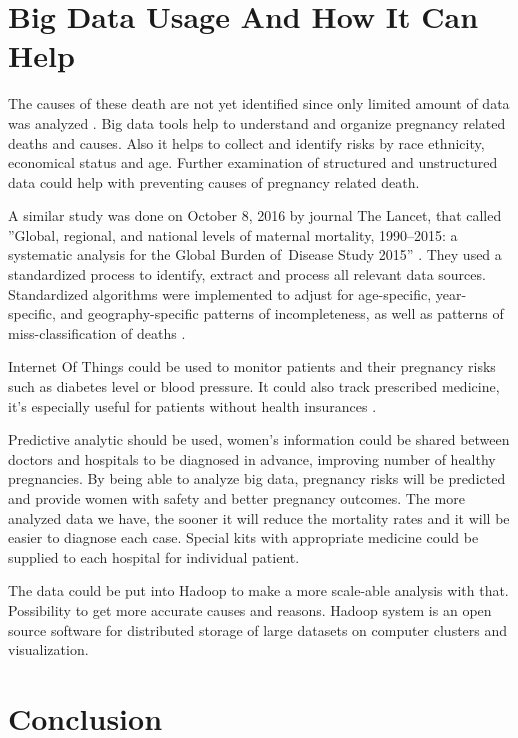 \documentclass[sigconf]{acmart}
\begin{document}
\section{Big Data Usage And How It Can Help}

The causes of these death are not yet identified since only limited amount of data was analyzed \cite{creanga2012race}. Big data tools help to understand and organize pregnancy related deaths and causes. Also it helps to collect and identify risks by race ethnicity, economical status and age. Further examination of structured and unstructured data could help with preventing causes of pregnancy related death.

A similar study was done on October 8, 2016 by  journal The Lancet, that called ''Global, regional, and national levels of maternal mortality, 1990–2015: a systematic analysis for the Global Burden of Disease Study 2015'' \cite{kassebaum2016global}. They used a standardized process to identify, extract and process all relevant data sources. Standardized algorithms were implemented to adjust for age-specific, year-specific, and geography-specific patterns of incompleteness, as well as patterns of miss-classification of deaths \cite{mcginnis2013best}.

Internet Of Things could be used to  monitor patients and their pregnancy risks  such as diabetes level or blood pressure. It could also track prescribed medicine, it’s especially useful for patients without health insurances \cite{kassebaum2016global}. 

Predictive analytic should be used, women’s information could be shared between doctors and hospitals to be diagnosed in advance, improving number of healthy pregnancies. By being able to analyze big data, pregnancy risks will be predicted and provide women with safety and better pregnancy outcomes. The more analyzed data we have, the sooner it will reduce the mortality rates and it will be easier to diagnose each case. Special kits with appropriate medicine could be supplied to each hospital for individual patient.

The data could be put into Hadoop to make a more scale-able analysis with that. Possibility to get more accurate causes and reasons. Hadoop system is an open source software for distributed storage of large datasets on computer clusters and visualization. 


\section{Conclusion}
\end{document}
